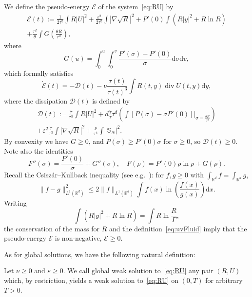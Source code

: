 \documentclass[AHL,Unicode,longabstracts]{cedram}
\DeclareMathOperator{\DIV}{div}
\newcommand*\R{\mathbb{R}}
\newcommand*\dd {\mathrm{d}}
\newcommand*\<{\left\langle}
\renewcommand*\>{\right\rangle}
\renewcommand*\le{\leqslant}
\renewcommand*\ge{\geqslant}
\newcommand*\eps{\varepsilon}
\begin{document}
We define the pseudo-energy $\mathcal E$ of the system~\eqref{eq:RU} by
\begin{multline}\label{eq:pseudo-energy}
\mathcal E(t) := \frac{1}{2\tau^2}\int R|U|^2+\frac{\eps^2}{2\tau^2} \int|\nabla \sqrt R|^2 +P'(0)\int (R |y|^2 + R \ln R) \\
+ \frac{\tau^d}{\theta}\int G\left(\frac{\theta R}{\tau^d}\right),
\end{multline}
where
\begin{equation*}
G(u) =\int_0^u\int_0^v \frac{P'(\sigma)-P'(0)}{\sigma} \dd \sigma \dd v,
\end{equation*}
which formally satisfies
\begin{equation}\label{eq:evol-pseudo}
\dot{\mathcal E}(t) =- \mathcal D(t) - \nu \frac{\dot
\tau(t)}{\tau(t)^3} \int R(t,y) \DIV U(t,y)\dd y,
\end{equation}
where the dissipation $\mathcal D(t) $ is defined by
\begin{multline}\label{eq:dissip-pseudo}
\mathcal D(t) := \frac{\dot \tau}{\tau^3}\int R |U|^2 + d\frac{\dot \tau}{\tau} \tau^d \left(\int \left[P\left(\sigma\right) -\sigma P'(0) \right] \big|_{\sigma= \frac{ \theta R}{\tau^d}} \right) \\
+\eps^2 \frac{\dot \tau}{\tau^3} \int |\nabla \sqrt R|^2 + \frac{\nu}{\tau^4} \int |\mathbb S_N|^2.
\end{multline}
By convexity we have $G\ge 0$, and $P(\sigma)\ge P'(0)\sigma$ for $\sigma\ge 0$, so $\mathcal D(t)\ge 0$. Note also the identities
\begin{equation}\label{eq:FG}
F''(\sigma) = \frac{P'(0)}{\sigma}+G''(\sigma),\quad F(\rho) = P'(0)\rho\ln \rho + G(\rho).
\end{equation}
Recall the Csisz\'ar--Kullback inequality (see e.g.~\cite[Theorem~8.2.7]{LogSob}): for $f,g\ge 0$ with $\int_{\R^d} f=\int_{\R^d} g$,
\begin{equation*}
\|f-g\|_{L^1({\mathbb R}^d)}^2\le 2 \|f\|_{L^1({\mathbb R}^d)}\int f(x)\ln \left(\frac{f(x)}{g(x)}\right) \dd x.
\end{equation*}
Writing
\[
\int (R |y|^2 + R \ln R) = \int R \ln \frac{R}{\Gamma},
\]
the conservation of the mass for $R$ and the definition~\eqref{eq:uvFluid} imply that the pseudo-energy $\mathcal E$ is non-negative, $\mathcal E\ge 0$.

As for global solutions, we have the following natural definition:

\begin{defi}\label{def:sol-globale}
Let $\nu \ge 0$ and $\varepsilon \ge 0.$ We call global weak solution to~\eqref{eq:RU} any pair $(R,U)$ which, by restriction, yields a weak solution to~\eqref{eq:RU} on $(0,T)$ for arbitrary $T>0.$
\end{defi}
\end{document}
